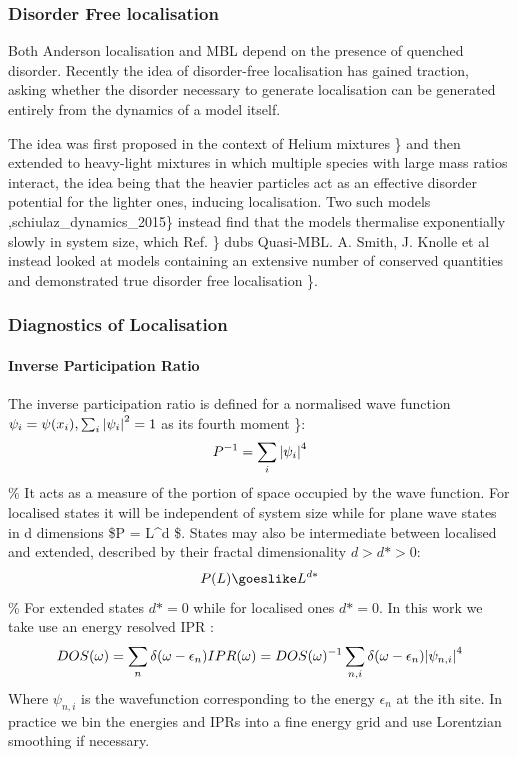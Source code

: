\hypertarget{disorder-free-localisation}{%
\subsubsection{Disorder Free
localisation}\label{disorder-free-localisation}}

Both Anderson localisation and MBL depend on the presence of quenched
disorder. Recently the idea of disorder-free localisation has gained
traction, asking whether the disorder necessary to generate localisation
can be generated entirely from the dynamics of a model itself.

The idea was first proposed in the context of Helium mixtures
\textcite{kagan1984localization}\} and then extended to heavy-light
mixtures in which multiple species with large mass ratios interact, the
idea being that the heavier particles act as an effective disorder
potential for the lighter ones, inducing localisation. Two such models
\textcite{yao_quasi-many-body_2016},schiulaz\_dynamics\_2015\} instead
find that the models thermalise exponentially slowly in system size,
which Ref. \textcite{yao_quasi-many-body_2016}\} dubs Quasi-MBL. A.
Smith, J. Knolle et al instead looked at models containing an extensive
number of conserved quantities and demonstrated true disorder free
localisation \textcite{smith_disorder-free_2017}\}.

\hypertarget{diagnostics-of-localisation}{%
\subsubsection{Diagnostics of
Localisation}\label{diagnostics-of-localisation}}

\hypertarget{inverse-participation-ratio}{%
\paragraph{Inverse Participation
Ratio}\label{inverse-participation-ratio}}

The inverse participation ratio is defined for a normalised wave
function \(\psi_i = \psi(x_i), \sum_i \abs{\psi_i}^2 = 1\) as its fourth
moment \textcite{kramer_localization_1993}\}: \[
P^{-1} = \sum_i \abs{\psi_i}^4
\] \% It acts as a measure of the portion of space occupied by the wave
function. For localised states it will be independent of system size
while for plane wave states in d dimensions \$P = L\^{}d \$. States may
also be intermediate between localised and extended, described by their
fractal dimensionality \(d > d* > 0\): \[
P(L) \goeslike L^{d*} 
\] \% For extended states \(d* = 0\) while for localised ones
\(d* = 0\). In this work we take use an energy resolved IPR
\textcite{antipov_interaction-tuned_2016-1}: \[
DOS(\omega) = \sum_n \delta(\omega - \epsilon_n)
IPR(\omega) = DOS(\omega)^{-1} \sum_{n,i} \delta(\omega - \epsilon_n) \abs{\psi_{n,i}}^4
\] Where \(\psi_{n,i}\) is the wavefunction corresponding to the energy
\(\epsilon_n\) at the ith site. In practice we bin the energies and IPRs
into a fine energy grid and use Lorentzian smoothing if necessary.

